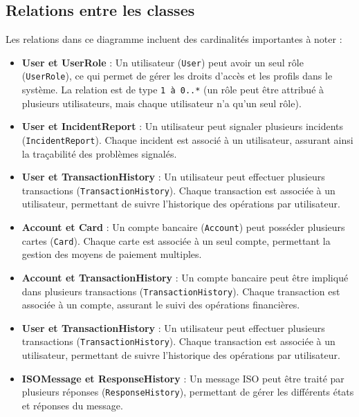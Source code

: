 {\subsection*{Relations entre les classes}

Les relations dans ce diagramme incluent des cardinalités importantes à noter :

\begin{itemize}[label=\textbullet]
    \item \textbf{User et UserRole} : Un utilisateur (\texttt{User}) peut avoir un seul rôle (\texttt{UserRole}), ce qui permet de gérer les droits d'accès et les profils dans le système. 
    La relation est de type \texttt{1 à 0..*} (un rôle peut être attribué à plusieurs utilisateurs, mais chaque utilisateur n'a qu'un seul rôle).

       \item \textbf{User et Incident\nobreak Report} : Un utilisateur peut signaler plusieurs incidents (\texttt{Incident\break Report}). Chaque incident est associé à un utilisateur, assurant ainsi la traçabilité des problèmes signalés.

    \item \textbf{User et TransactionHistory} : Un utilisateur peut effectuer plusieurs transactions (\texttt{TransactionHistory}). Chaque transaction est associée à un utilisateur, permettant de suivre l'historique des opérations par utilisateur.

    \item \textbf{Account et Card} : Un compte bancaire (\texttt{Account}) peut posséder plusieurs cartes (\texttt{Card}). Chaque carte est associée à un seul compte, permettant la gestion des moyens de paiement multiples.

    \item \textbf{Account et TransactionHistory} : Un compte bancaire peut être impliqué dans plusieurs transactions (\texttt{TransactionHistory}). Chaque transaction est associée à un compte, assurant le suivi des opérations financières.

        \item \textbf{User et Transaction\nobreak History} : Un utilisateur peut effectuer plusieurs transactions (\texttt{Transaction\break History}). Chaque transaction est associée à un utilisateur, permettant de suivre l'historique des opérations par utilisateur.


    \item \textbf{ISOMessage et ResponseHistory} : Un message ISO peut être traité par plusieurs réponses (\texttt{ResponseHistory}), permettant de gérer les différents états et réponses du message.


\end{itemize}}
